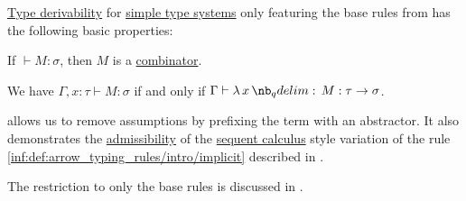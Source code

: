 \begin{proposition}\label{thm:def:simple_type_derivability}
  \hyperref[def:simple_type_derivability]{Type derivability} for \hyperref[def:simple_type_system]{simple type systems} only featuring the base rules from  has the following basic properties:
  \begin{thmenum}
     If \( {}\vdash M: \sigma \), then \( M \) is a \hyperref[def:lambda_combinator]{combinator}.

     We have \( \Gamma, x: \tau \vdash M: \sigma \) if and only if \( \Gamma \vdash \qabs x M: \tau \to \sigma \).
  \end{thmenum}
\end{proposition}
\begin{comments}
  \item {} allows us to remove assumptions by prefixing the term with an abstractor. It also demonstrates the \hyperref[con:inference_rule_admissibility]{admissibility} of the \hyperref[rem:sequent_calculus]{sequent calculus} style variation of the rule \ref{inf:def:arrow_typing_rules/intro/implicit} described in .

  \item The restriction to only the base rules is discussed in .
\end{comments}
